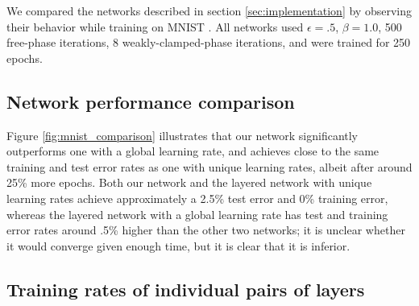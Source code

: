\documentclass[utf8]{frontiersSCNS}
\begin{document}
We compared the networks described in section \ref{sec:implementation} by observing their behavior while training on MNIST \cite{mnist1998}. All networks used $\epsilon=.5$, $\beta=1.0$, 500 free-phase iterations, 8 weakly-clamped-phase iterations, and were trained for 250 epochs.

\subsection{Network performance comparison}
\label{sec:network_performance}

Figure \ref{fig:mnist_comparison} illustrates that our network significantly outperforms one with a global learning rate, and achieves close to the same training and test error rates as one with unique learning rates, albeit after around 25\% more epochs. Both our network and the layered network with unique learning rates achieve approximately a 2.5\% test error and 0\% training error, whereas the layered network with a global learning rate has test and training error rates around .5\% higher than the other two networks; it is unclear whether it would converge given enough time, but it is clear that it is inferior.

\subsection{Training rates of individual pairs of layers}
\label{sec:mnist_perlayer}
\end{document}
